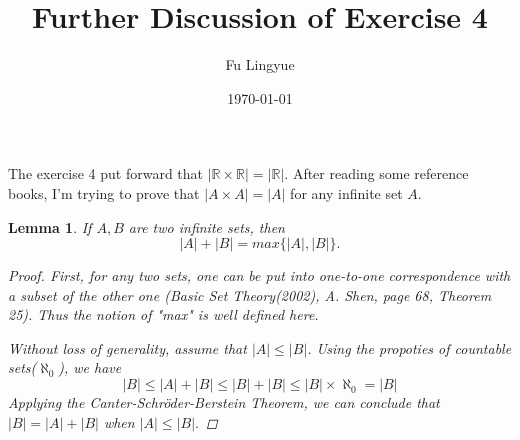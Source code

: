 \documentclass{article}
\title{Further Discussion of Exercise 4}
\author{Fu Lingyue}
\date{\today}
\newtheorem{lemma}[theorem]{Lemma}
\begin{document}
    \maketitle
    The exercise 4 put forward that 
    $| \mathbb{R} \times \mathbb{R}|  = |  \mathbb R| $.
    After reading some reference books, I'm trying to prove that 
    $|  A\times A|  = |  A| $ for any infinite set $A$.
    
    \begin{lemma}
        If $A,B$ are two infinite sets, then 
        $$|  A|  +|  B|  = max\{|  A| ,|  B| \}.$$
    
        \begin{proof}
            First, for any two sets, one can be put into one-to-one correspondence with a subset of the other one
            (Basic Set Theory(2002), A. Shen, page 68, Theorem 25).
            Thus the notion of "max" is well defined here.

            Without loss of generality, assume that $|A| \leq |B|$. 
            Using the propoties of countable sets($\aleph_0$), we have
            $$|B| \leq |A| + |B| \leq |B| + |B| \leq |B|\times \aleph_0 = |B|$$
            Applying the Canter-Schr\"{o}der-Berstein Theorem,
             we can conclude that $|B| = |A|+|B|$ when $|A| \leq |B|.$

        \end{proof}
    \end{lemma}
\end{document}
